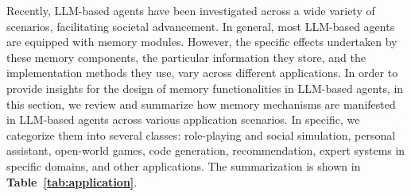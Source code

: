 \documentclass{article}
\theoremstyle{definition}
\theoremstyle{theorem}
\theoremstyle{proof}
\theoremstyle{remark}
\begin{document}
	Recently, LLM-based agents have been investigated across a wide variety of scenarios, facilitating societal advancement. In general, most LLM-based agents are equipped with memory modules. However, the specific effects undertaken by these memory components, the particular information they store, and the implementation methods they use, vary across different applications. In order to provide insights for the design of memory functionalities in LLM-based agents, in this section, we review and summarize how memory mechanisms are manifested in LLM-based agents across various application scenarios. In specific, we categorize them into several classes: role-playing and social simulation, personal assistant, open-world games, code generation, recommendation, expert systems in specific domains, and other applications. The summarization is shown in \textbf{Table~\ref{tab:application}}.
	
\end{document}
